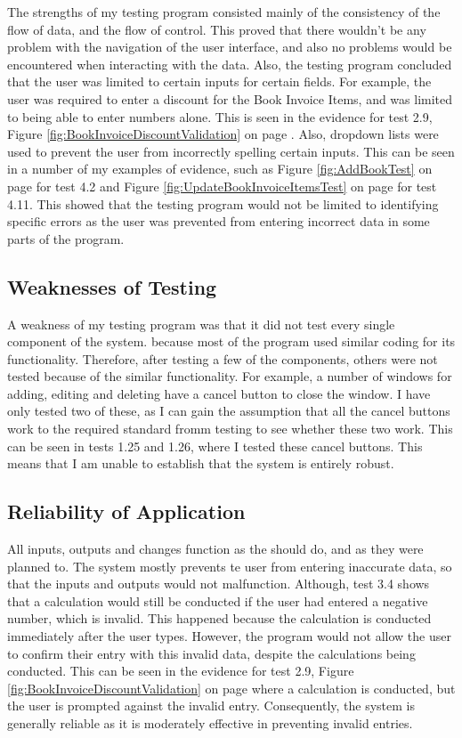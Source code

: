 The strengths of my testing program consisted mainly of the consistency of the flow of data, and the flow of control. This proved that there wouldn't be any problem with the navigation of the user interface, and also no problems would be encountered when interacting with the data. Also, the testing program concluded that the user was limited to certain inputs for certain fields. For example, the user was required to enter a discount for the Book Invoice Items, and was limited to being able to enter numbers alone. This is seen in the evidence for test 2.9, Figure \ref{fig:BookInvoiceDiscountValidation} on page \pageref{fig:BookInvoiceDiscountValidation}. Also, dropdown lists were used to prevent the user from incorrectly spelling certain inputs. This can be seen in a number of my examples of evidence, such as Figure \ref{fig:AddBookTest} on page \pageref{fig:AddBookTest} for test 4.2 and Figure \ref{fig:UpdateBookInvoiceItemsTest} on page \pageref{fig:UpdateBookInvoiceItems} for test 4.11. This showed that the testing program would not be limited to identifying specific errors as the user was prevented from entering incorrect data in some parts of the program.

\subsection{Weaknesses of Testing}

A weakness of my testing program was that it did not test every single component of the system. because most of the program used similar coding for its functionality. Therefore, after testing a few of the components, others were not tested because of the similar functionality. For example, a number of windows for adding, editing and deleting have a cancel button to close the window. I have only tested two of these, as I can gain the assumption that all the cancel buttons work to the required standard fromm testing to see whether these two work. This can be seen in tests 1.25 and 1.26, where I tested these cancel buttons. This means that I am unable to establish that the system is entirely robust.

\subsection{Reliability of Application}

All inputs, outputs and changes function as the should do, and as they were planned to. The system mostly prevents te user from entering inaccurate data, so that the inputs and outputs would not malfunction. Although, test 3.4 shows that a calculation would still be conducted if the user had entered a negative number, which is invalid. This happened because the calculation is conducted immediately after the user types. However, the program would not allow the user to confirm their entry with this invalid data, despite the calculations being conducted. This can be seen in the evidence for test 2.9, Figure \ref{fig:BookInvoiceDiscountValidation} on page \pageref{fig:BookInvoiceDiscountValidation} where a calculation is conducted, but the user is prompted against the invalid entry. Consequently, the system is generally reliable as it is moderately effective in preventing invalid entries.

